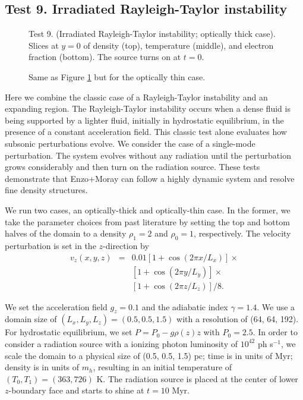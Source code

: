 \documentclass[useAMS,usenatbib,a4paper]{mn2e}
\begin{document}
\subsection{Test 9. Irradiated Rayleigh-Taylor instability}

\begin{figure}
  \caption{\label{fig:test9_thick} Test 9. (Irradiated Rayleigh-Taylor
    instability; optically thick case).  Slices at $y=0$ of density
    (top), temperature (middle), and electron fraction (bottom).  The
    source turns on at $t=0$.}
\end{figure}

\begin{figure}
  \caption{\label{fig:test9_thin} Same as Figure \ref{fig:test9_thick}
    but for the optically thin case.}
\end{figure}

Here we combine the classic case of a Rayleigh-Taylor instability and
an expanding \hii region.  The Rayleigh-Taylor instability
occurs when a dense fluid is being supported by a lighter fluid,
initially in hydrostatic equilibrium, in the presence of a constant
acceleration field.  This classic test alone evaluates how subsonic
perturbations evolve.  We consider the case of a single-mode
perturbation.  The system evolves without any radiation until the
perturbation grows considerably and then turn on the radiation source.
These tests demonstrate that Enzo+Moray can follow a highly dynamic
system and resolve fine density structures.

We run two cases, an optically-thick and optically-thin case.  In
the former, we take the parameter choices from past literature
\citep[e.g.][]{Liska03, Stone08} by setting the top and bottom halves
of the domain to a density $\rho_1 = 2$ and $\rho_0 = 1$,
respectively.  The velocity perturbation is set in the $z$-direction
by
\begin{eqnarray}
  v_z(x,y,z) & = & 0.01 [1 + \cos(2\pi x / L_x)] \times  \nonumber\\
  & & [1 + \cos(2\pi y / L_y)] \times \nonumber\\
  & & [1 + \cos(2\pi z / L_z)]/8.
\end{eqnarray}

We set the acceleration field $g_z = 0.1$ and the adiabatic index
$\gamma = 1.4$.  We use a domain size of $(L_x, L_y, L_z) = (0.5, 0.5,
1.5)$ with a resolution of (64, 64, 192).  For hydrostatic
equilibrium, we set $P = P_0 - g \rho(z) z$ with $P_0 = 2.5$.  In
order to consider a radiation source with a ionizing photon luminosity
of $10^{42}$ ph s$^{-1}$, we scale the domain to a physical size of
(0.5, 0.5, 1.5) pc; time is in units of Myr; density is in units of
$m_h$, resulting in an initial temperature of $(T_0, T_1) = (363,
726)$ K.  The radiation source is placed at the center of lower
$z$-boundary face and starts to shine at $t = 10$ Myr.
\end{document}
